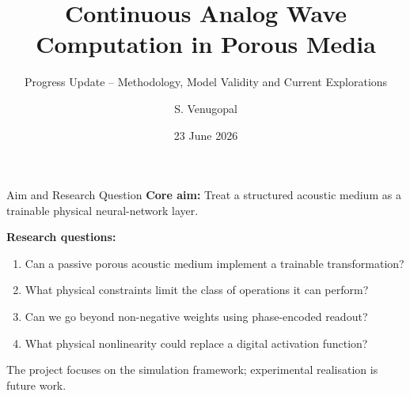 \documentclass[aspectratio=169,11pt]{beamer}
\title{Continuous Analog Wave Computation in Porous Media}
\subtitle{Progress Update -- Methodology, Model Validity and Current Explorations}
\author{S. Venugopal}
\institute{Cranfield University\hspace{0.3cm}|\hspace{0.3cm}Supervisors: Prof. Weisi Guo, Prof. Takis Tsoutsanis}
\date{23 June 2026}
\begin{document}
\begin{frame}[plain]
  \titlepage
\end{frame}

\begin{frame}{Aim and Research Question}
  \textbf{Core aim:} Treat a structured acoustic medium as a trainable physical neural-network layer.

  \vspace{0.4cm}
  \textbf{Research questions:}
  \begin{enumerate}
    \item Can a passive porous acoustic medium implement a trainable transformation?
    \item What physical constraints limit the class of operations it can perform?
    \item Can we go beyond non-negative weights using phase-encoded readout?
    \item What physical nonlinearity could replace a digital activation function?
  \end{enumerate}

  \vspace{0.3cm}
  \textcolor{gdpSlate}{\small The project focuses on the simulation framework; experimental realisation is future work.}
\end{frame}
\end{document}
